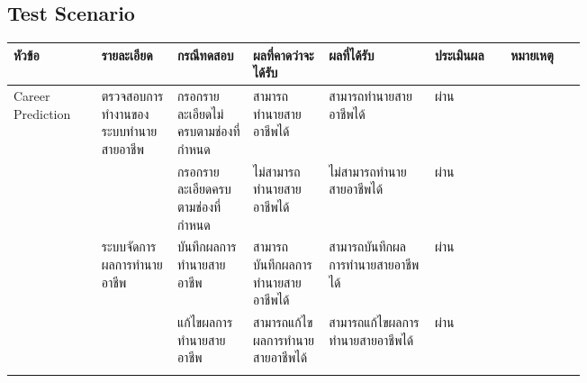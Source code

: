 \subsection{Test Scenario}
\begin{longtable}{>{\centering}p{0.1\linewidth}|p{0.1\linewidth}|p{0.1\linewidth}|p{0.1\linewidth}|p{0.14\linewidth}|>{\centering}p{0.1\linewidth}|p{0.1\linewidth}}
    หัวข้อ               & รายละเอียด                        & กรณีทดสอบ                                          & ผลที่คาดว่าจะได้รับ                                                              & ผลที่ได้รับ                                                                            & ประเมินผล & หมายเหตุ                                                \\ \hline
    \endhead
    Career Prediction  & ตรวจสอบการทำงานของระบบทำนายสายอาชีพ & กรอกรายละเอียดไม่ครบตามช่องที่กำหนด                     & สามารถทำนายสายอาชีพได้                                                         & สามารถทำนายสายอาชีพได้                                                                & ผ่าน      &                                                        \\ \cline{3-7}
                       &                                  & กรอกรายละเอียดครบตามช่องที่กำหนด                       & ไม่สามารถทำนายสายอาชีพได้                                                       & ไม่สามารถทำนายสายอาชีพได้                                                              & ผ่าน      &                                                        \\
    \cline{2-7}
                       & ระบบจัดการผลการทำนายอาชีพ           & บันทึกผลการทำนายสายอาชีพ                              & สามารถบันทึกผลการทำนายสายอาชีพได้                                                & สามารถบันทึกผลการทำนายสายอาชีพได้                                                       & ผ่าน      &                                                        \\ \cline{3-7}
                       &                                  & แก้ไขผลการทำนายสายอาชีพ                              & สามารถแก้ไขผลการทำนายสายอาชีพได้                                                & สามารถแก้ไขผลการทำนายสายอาชีพได้                                                       & ผ่าน      &                                                        \\ \cline{3-7}

\end{longtable}
